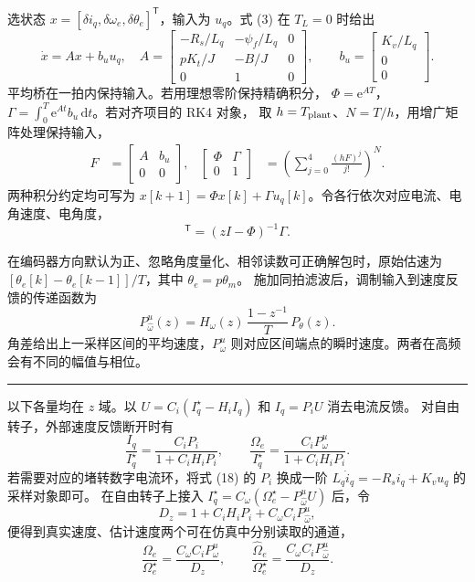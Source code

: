\documentclass[UTF8,fontset=windows,11pt,a4paper]{ctexart}
\newcommand{\titleline}[1]{\noindent{\sffamily\bfseries\fontsize{20}{25}\selectfont #1}\par\vspace{.25em}\hrule\vspace{.45em}}
\newcommand{\subt}[1]{\par\vspace{.55em}{\sffamily\bfseries\large #1}\par\nobreak}
\newcommand{\Ci}{C_i}
\newcommand{\Cw}{C_{\omega}}
\newcommand{\Hi}{H_i}
\newcommand{\Hw}{H_{\omega}}
\newcommand{\we}{\Omega_e}
\newcommand{\Wref}{\Omega_e^\star}
\newcommand{\Iq}{I_q}
\newcommand{\Ir}{I_q^\star}
\newcommand{\Kt}{K_t}
\newcommand{\kv}{K_v}
\newcommand{\psiP}{\psi_f}
\newcommand{\ee}{\mathrm{e}}
\newcommand{\dd}{\mathrm d}
\begin{document}
\subt{从控制指令到一拍后可读出的电机状态}
选状态 $x=[\delta i_q,\delta\omega_e,\delta\theta_e]^{\mathsf T}$，输入为 $u_q$。式 (3) 在 $T_L=0$ 时给出
\begin{equation}
 \dot x=A x+ b_u u_q,\quad
 A=\begin{bmatrix}-R_s/L_q &-\psiP/L_q &0\\ p\Kt/J&-B/J&0\\0&1&0\end{bmatrix},
 \qquad b_u=\begin{bmatrix}\kv/L_q\\0\\0\end{bmatrix}. \tag{14}
\end{equation}
平均桥在一拍内保持输入。若用理想零阶保持精确积分，
$\Phi=\ee^{AT}$，$\Gamma=\int_0^T\ee^{At}b_u\,\dd t$。若对齐项目的 RK4 对象，
取 $h=T_{\rm plant}$、$N=T/h$，用增广矩阵处理保持输入，
\begin{align}
 F&=\begin{bmatrix} A & b_u\\ 0&0\end{bmatrix},&
 \begin{bmatrix}\Phi&\Gamma\\0&1\end{bmatrix}
 &=\left(\sum_{j=0}^{4}\frac{(hF)^j}{j!}\right)^{\!N}. \tag{15}
\end{align}
两种积分约定均可写为 $x[k+1]=\Phi x[k]+\Gamma u_q[k]$。令各行依次对应电流、电角速度、电角度，
\begin{equation}
 [P_i(z),P_\omega^{u}(z),P_\theta(z)]^{\mathsf T}=(zI-\Phi)^{-1}\Gamma . \tag{16}
\end{equation}

\subt{估速器从两次角度读数获得平均速度}
在编码器方向默认为正、忽略角度量化、相邻读数可正确解包时，原始估速为
$[\theta_e[k]-\theta_e[k-1]]/T$，其中 $\theta_e=p\theta_m$。
施加同拍滤波后，调制输入到速度反馈的传递函数为
\begin{equation}
 P_{\widehat\omega}^{u}(z)=\Hw(z)\,\frac{1-z^{-1}}{T}\,P_\theta(z). \tag{17}
\end{equation}
角差给出上一采样区间的平均速度，$P_\omega^{u}$ 则对应区间端点的瞬时速度。两者在高频会有不同的幅值与相位。

\newpage
\titleline{5\quad 采样闭环与数值核对}
以下各量均在 $z$ 域。以 $U=\Ci(\Ir-\Hi\Iq)$ 和 $\Iq=P_i U$ 消去电流反馈。
对自由转子，外部速度反馈断开时有
\begin{equation}
 \frac{\Iq}{\Ir}=\frac{\Ci P_i}{1+\Ci\Hi P_i},\qquad
 \frac{\we}{\Ir}=\frac{\Ci P_\omega^u}{1+\Ci\Hi P_i}.
 \tag{18}
\end{equation}
若需要对应的堵转数字电流环，将式 (18) 的 $P_i$ 换成一阶 $L_q\dot i_q=-R_s i_q+\kv u_q$ 的采样对象即可。
在自由转子上接入 $\Ir=\Cw(\Wref-P_{\widehat\omega}^u U)$ 后，令
\[
 D_z=1+\Ci\Hi P_i+\Cw\Ci P_{\widehat\omega}^u ,
\]
便得到真实速度、估计速度两个可在仿真中分别读取的通道，
\begin{equation}
 \boxed{\frac{\we}{\Wref}=\frac{\Cw\Ci P_\omega^u}{D_z}},\qquad
 \boxed{\frac{\widehat\Omega_e}{\Wref}=\frac{\Cw\Ci P_{\widehat\omega}^u}{D_z}} .
 \tag{19}
\end{equation}
\end{document}
